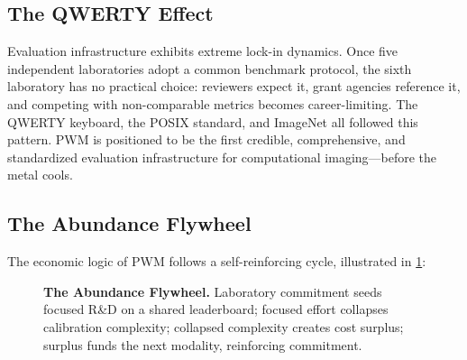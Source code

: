 \subsection{The QWERTY Effect}

Evaluation infrastructure exhibits extreme lock-in dynamics.  Once five
independent laboratories adopt a common benchmark protocol, the sixth
laboratory has no practical choice: reviewers expect it, grant agencies
reference it, and competing with non-comparable metrics becomes
career-limiting.  The QWERTY keyboard, the POSIX standard, and ImageNet
all followed this pattern.  PWM is positioned to be the first credible,
comprehensive, and standardized evaluation infrastructure for
computational imaging---before the metal cools.

\subsection{The Abundance Flywheel}
\label{sec:flywheel}

The economic logic of PWM follows a self-reinforcing cycle, illustrated
in \cref{fig:flywheel}:

\begin{figure}[t]
\centering
{}
\caption{%
  \textbf{The Abundance Flywheel.}  Laboratory commitment seeds focused
  R\&D on a shared leaderboard; focused effort collapses calibration
  complexity; collapsed complexity creates cost surplus; surplus funds
  the next modality, reinforcing commitment.}
\label{fig:flywheel}
\end{figure}


